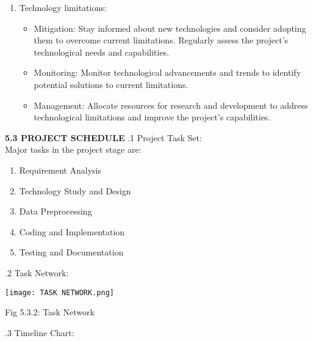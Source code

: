 \documentclass[12pt]{article}
\begin{document}
\begin{enumerate}
\item  Technology limitations:
\begin{itemize}
    \item Mitigation: Stay informed about new technologies and consider adopting them to overcome current limitations. Regularly assess the project's technological needs and capabilities.
    \item Monitoring: Monitor technological advancements and trends to identify potential solutions to current limitations.
    \item Management: Allocate resources for research and development to address technological limitations and improve the project's capabilities.
\end{itemize}

\end{enumerate}
\bigskip

\justify \textbf{5.3 PROJECT SCHEDULE}
.1 Project Task Set:\\

Major tasks in the project stage are:
\begin{enumerate}
    \item Requirement Analysis
    \item Technology Study and Design
    \item Data Preprocessing
    \item Coding and Implementation
    \item Testing and Documentation
\end{enumerate}
\pagebreak{}

.2 Task Network:
\begin{center}
   \justify \texttt{[image: TASK NETWORK.png]}
\end{center}

\begin{center}
    Fig 5.3.2: Task Network
\end{center}

.3 Timeline Chart:
\end{document}
